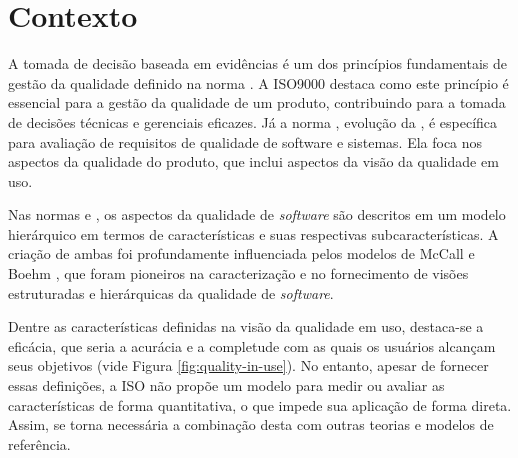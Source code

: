 \section{Contexto}\label{contextualizacao}


A tomada de decisão baseada em evidências é um dos princípios fundamentais de gestão da qualidade definido na norma . A ISO9000 destaca como este princípio é essencial para a gestão da qualidade de um produto, contribuindo para a tomada de decisões técnicas e gerenciais eficazes. Já a norma , evolução da , é específica para avaliação de requisitos de qualidade de software e sistemas. Ela foca nos aspectos da qualidade do produto, que inclui aspectos da visão da qualidade em uso. 

Nas normas  e , os aspectos da qualidade de \textit{software} são descritos em um modelo hierárquico em termos de características e suas respectivas subcaracterísticas. A criação de ambas foi profundamente influenciada pelos modelos de McCall \cite{mccall1977factors} e Boehm \cite{boehm1978characteristics}, que foram pioneiros na caracterização e no fornecimento de visões estruturadas e hierárquicas da qualidade de \textit{software}.


Dentre as características definidas na visão da  qualidade em uso, destaca-se a eficácia, que seria a acurácia e a completude com as quais os usuários alcançam seus objetivos (vide Figura \ref{fig:quality-in-use}). No entanto, apesar de fornecer essas definições, a ISO não propõe um modelo para medir ou avaliar as características de forma quantitativa, o que impede sua aplicação de forma direta. Assim, se torna necessária a combinação desta com outras teorias e modelos de referência.

